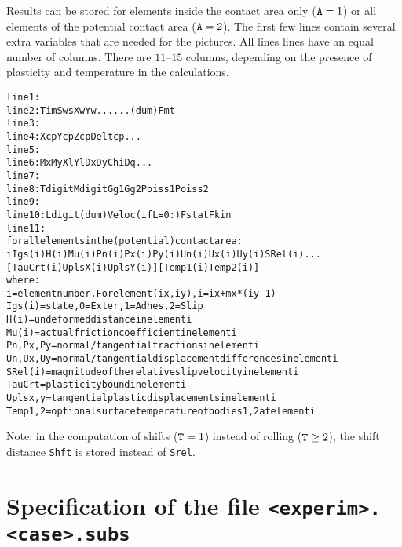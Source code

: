 \documentclass[12pt]{report}
\begin{document}
Results can be stored for elements inside the contact area only
(${\tt A}=1$) or all elements of the potential contact area (${\tt
A}=2$). The first few lines contain several extra variables that are needed
for the pictures. All lines lines have an equal number of columns. There
are $11\text{--}15$ columns, depending on the presence of plasticity and
temperature in the calculations.
\begin{alltt}\small
 line  1: % comment line, describing wheel and rail markers
 line  2:   Tim   Sws   Xw    Yw      ...                 ...   (dum)  Fmt
 line  3: % comment line, describing contact reference position
 line  4:   Xcp   Ycp   Zcp   Deltcp  ...
 line  5: % comment line, describing grid discretisation variables
 line  6:   Mx    My    Xl    Yl    Dx    Dy   Chi   Dq  ...
 line  7: % comment line, describing the material parameters used
 line  8:   Tdigit Mdigit Gg1    Gg2    Poiss1 Poiss2
 line  9: % comment line, describing the friction law used
 line 10:   Ldigit  (dum)  Veloc  (if L=0:) Fstat  Fkin
 line 11: % comment line, describing columns of the table
 for all elements in the (potential) contact area:
   i  Igs(i)  H(i)  Mu(i)  Pn(i)  Px(i)  Py(i)  Un(i)  Ux(i)  Uy(i)  SRel(i) ...
                            [ TauCrt(i) UplsX(i) UplsY(i) ] [ Temp1(i) Temp2(i)]
 where:
   i        = element number. For element (ix,iy), i = ix + mx*(iy-1)
   Igs(i)   = state, 0=Exter, 1=Adhes, 2=Slip
   H(i)     = undeformed distance in element i
   Mu(i)    = actual friction coefficient in element i
   Pn,Px,Py = normal/tangential tractions in element i
   Un,Ux,Uy = normal/tangential displacement differences in element i
   SRel(i)  = magnitude of the relative slip velocity in element i
   TauCrt   = plasticity bound in element i
   Uplsx,y  = tangential plastic displacements in element i
   Temp1,2  = optional surface temperature of bodies 1, 2 at element i
\end{alltt}
Note: in the computation of shifts (${\tt T}=1$) instead of rolling
(${\tt T}\ge 2$), the shift distance {\tt Shft} is stored instead of
{\tt Srel}.

\section{Specification of the file {\tt <experim>.<case>.subs}}
\label{sec:spec_subs}
\end{document}
